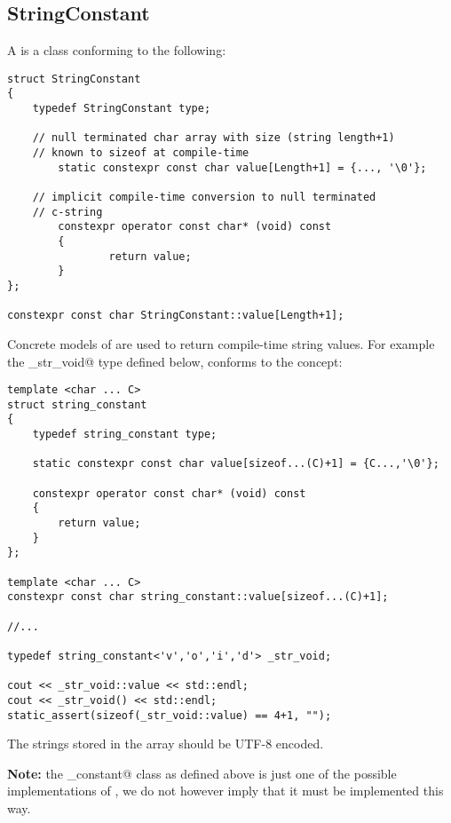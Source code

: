 \subsection{StringConstant}
\label{concept-StringConstant}

A  is a class conforming to the following:

\begin{verbatim}
struct StringConstant
{
	typedef StringConstant type;

	// null terminated char array with size (string length+1)
	// known to sizeof at compile-time
        static constexpr const char value[Length+1] = {..., '\0'};

	// implicit compile-time conversion to null terminated
	// c-string
        constexpr operator const char* (void) const
        {
                return value;
        }
};

constexpr const char StringConstant::value[Length+1];
\end{verbatim}

Concrete models of  are used to return compile-time string values.
For example the \verb@_str_void@ type defined below, conforms to the 
concept:

\begin{verbatim}
template <char ... C>
struct string_constant
{
	typedef string_constant type;

	static constexpr const char value[sizeof...(C)+1] = {C...,'\0'};

	constexpr operator const char* (void) const
	{
		return value;
	}
};

template <char ... C>
constexpr const char string_constant::value[sizeof...(C)+1];

//...

typedef string_constant<'v','o','i','d'> _str_void;

cout << _str_void::value << std::endl;
cout << _str_void() << std::endl;
static_assert(sizeof(_str_void::value) == 4+1, "");
\end{verbatim}

The strings stored in the \verb@value@ array should be UTF-8 encoded.

\textbf{Note:} the \verb@string_constant@ class as defined above is just one of the
possible implementations of , we do not however imply
that it must be implemented this way.
